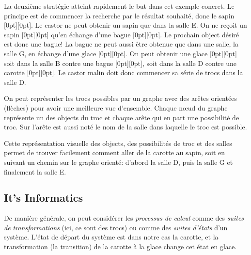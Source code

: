 \documentclass[a4paper,11pt]{report}
\newcommand{\taskGraphicsFolder}{..}
\begin{document}
La deuxième stratégie atteint rapidement le but dans cet exemple concret. Le principe est de commencer la recherche par le résultat souhaité, donc le sapin \raisebox{-0.5ex}[0pt][0pt]{}. Le castor ne peut obtenir un sapin que dans la salle E. On ne reçoit un sapin \raisebox{-0.5ex}[0pt][0pt]{} qu’en échange d’une bague \raisebox{-0.5ex}[0pt][0pt]{}. Le prochain object désiré est donc une bague! La bague ne peut aussi être obtenue que dans une salle, la salle G, en échange d’une glace \raisebox{-0.5ex}[0pt][0pt]{}. On peut obtenir une glace  \raisebox{-0.5ex}[0pt][0pt]{} soit dans la salle B contre une bague \raisebox{-0.5ex}[0pt][0pt]{}, soit dans la salle D contre une carotte \raisebox{-0.5ex}[0pt][0pt]{}. Le castor malin doit donc commencer sa série de trocs dans la salle D.

On peut représenter les trocs possibles par un graphe avec des arêtes orientées (flèches) pour avoir une meilleure vue d’ensemble. Chaque nœud du graphe représente un des objects du troc et chaque arête qui en part une possibilité de troc. Sur l’arête est aussi noté le nom de la salle dans laquelle le troc est possible.

{\centering%
\par}

Cette représentation visuelle des objects, des possibilités de troc et des salles permet de trouver facilement comment aller de la carotte au sapin, soit en suivant un chemin sur le graphe orienté: d’abord la salle D, puis la salle G et finalement la salle E.


\subsection*{It’s Informatics}

De manière générale, on peut considérer les \emph{processus de calcul} comme des \emph{suites de transformations} (ici, ce sont des trocs) ou comme des \emph{suites d’états} d’un système. L’état de départ du système est dans notre cas la carotte, et la transformation (la transition) de la carotte à la glace change cet état en glace.
\end{document}
